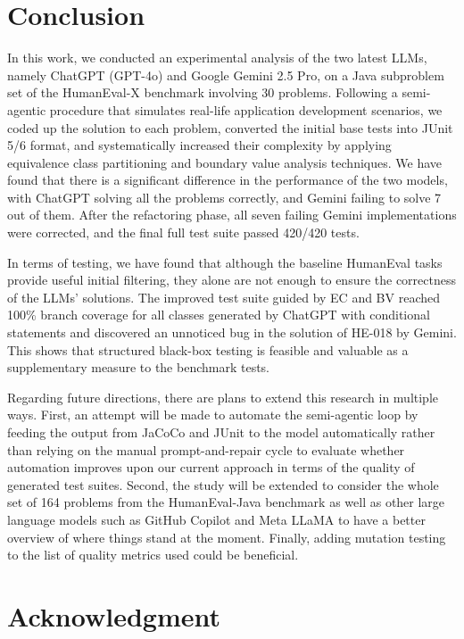 \documentclass[journal]{IEEEtran}
\begin{document}
\section{Conclusion}
\label{sec:conclude}

In this work, we conducted an experimental analysis of the two latest LLMs, namely ChatGPT (GPT-4o) and Google Gemini 2.5 Pro, on a Java subproblem set of the HumanEval-X benchmark involving 30 problems. Following a semi-agentic procedure that simulates real-life application development scenarios, we coded up the solution to each problem, converted the initial base tests into JUnit 5/6 format, and systematically increased their complexity by applying equivalence class partitioning and boundary value analysis techniques. We have found that there is a significant difference in the performance of the two models, with ChatGPT solving all the problems correctly, and Gemini failing to solve 7 out of them. After the refactoring phase, all seven failing Gemini implementations were corrected, and the final full test suite passed 420/420 tests.

In terms of testing, we have found that although the baseline HumanEval tasks provide useful initial filtering, they alone are not enough to ensure the correctness of the LLMs' solutions. The improved test suite guided by EC and BV reached 100\% branch coverage for all classes generated by ChatGPT with conditional statements and discovered an unnoticed bug in the solution of HE-018 by Gemini. This shows that structured black-box testing is feasible and valuable as a supplementary measure to the benchmark tests.

Regarding future directions, there are plans to extend this research in multiple ways. First, an attempt will be made to automate the semi-agentic loop by feeding the output from JaCoCo and JUnit to the model automatically rather than relying on the manual prompt-and-repair cycle to evaluate whether automation improves upon our current approach in terms of the quality of generated test suites. Second, the study will be extended to consider the whole set of 164 problems from the HumanEval-Java benchmark as well as other large language models such as GitHub Copilot and Meta LLaMA to have a better overview of where things stand at the moment. Finally, adding mutation testing to the list of quality metrics used could be beneficial.

\section*{Acknowledgment}
\label{sec:ack}




\end{document}
